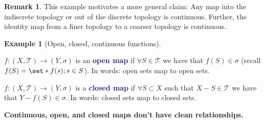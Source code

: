 \documentclass[11pt]{article}
\numberwithin{equation}{section}
\newcommand{\navy}[1]{\textcolor{MidnightBlue}{\bf #1}}
\newcounter{theo}[section]\setcounter{theo}{0}
\theoremstyle{definition}
\theoremstyle{definition}
\newtheorem{example}{\color{WildStrawberry}Example}[section]
\newtheorem*{remark}{Remark}
\def\Set{\set*}%
\def\ss{\subset}
\newcommand{\1}{\mathbbm 1}
\newcommand{\tT}{\mathcal T}
\begin{document}
\begin{remark}
	This example motivates a more general claim: Any map into the indiscrete topology or out of the discrete topology is continuous. Further, the identity map from a finer topology to a coarser topology is continuous. 
\end{remark}


\begin{example}[Open, closed, continuous functions]
	\begin{definition}
		$f: (X,\tT) \to (Y,\sigma)$ is an \navy{open map} if $\forall S \in \tT$ we have that $f(S) \in \sigma$ (recall $f(S) = \Set{f(s);s \in S}$). In words: open sets map to open sets. 
	\end{definition}

	\begin{definition}
		$f: (X,\tT) \to (Y,\sigma)$ is a \navy{closed map} if $\forall S \ss X$ such that $X - S \in \tT$ we have that $Y - f(S) \in \sigma$. In words: closed sets map to closed sets. 
	\end{definition}
	
	\textbf{Continuous, open, and closed maps don't have clean relationships.} 


\end{example}
\end{document}
